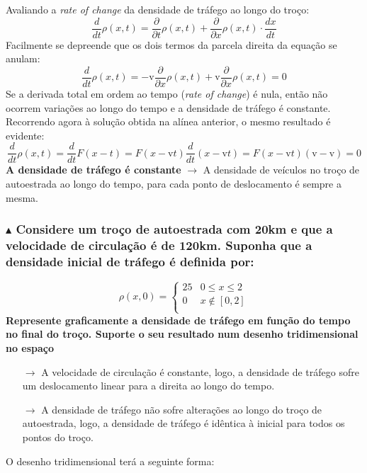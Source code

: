 Avaliando a \textit{rate of change} da densidade de tráfego ao longo do troço:
$$
    \frac{d}{d t}\rho(x,t) = \frac{\partial}{\partial t}\rho(x,t) + \frac{\partial}{\partial x}\rho(x,t)\cdot \frac{dx}{dt}
$$
Facilmente se depreende que os dois termos da parcela direita da equação se anulam:
$$
    \frac{d}{d t}\rho(x,t) = -\text{v}\frac{\partial}{\partial x}\rho(x,t) + \text{v}\frac{\partial}{\partial x}\rho(x,t) = 0
$$
\noindent Se a derivada total em ordem ao tempo (\textit{rate of change}) é nula, então não ocorrem variações ao longo do tempo e a densidade de tráfego é constante. Recorrendo agora à solução obtida na alínea anterior, o mesmo resultado é evidente:
$$
    \frac{d}{d t}\rho(x,t) = \frac{d}{d t}F(x - t) = F(x - \text{v}t)\frac{d}{d t} (x - \text{v}t) = F(x - \text{v}t)(\text{v} - \text{v}) = 0
$$
\noindent\textbf{A densidade de tráfego é constante} $\pmb{\rightarrow}$ A densidade de veículos no troço de autoestrada ao longo do tempo, para cada ponto de deslocamento é sempre a mesma.

\subsubsection*{$\blacktriangle$ Considere um troço de autoestrada com 20km e que a velocidade de
circulação é de 120km. Suponha que a densidade inicial de tráfego é definida por:}
\vspace{-1em}
$$
    \rho(x,0) = \begin{cases}
                    25 & 0 \le x \le 2\\
                    0  & x\notin [0,2]\\
                \end{cases}
$$
\noindent\textbf{Represente graficamente a densidade de tráfego em função do tempo no final
do troço. Suporte o seu resultado num desenho tridimensional no espaço}
\begin{itemize}
    \item[$\rightarrow$] A velocidade de circulação é constante, logo, a densidade de tráfego sofre um deslocamento linear para a direita ao longo do tempo.
    \item[$\rightarrow$] A densidade de tráfego não sofre alterações ao longo do troço de autoestrada, logo, a densidade de tráfego é idêntica à inicial para todos os pontos do troço.
\end{itemize}

\noindent O desenho tridimensional terá a seguinte forma:

